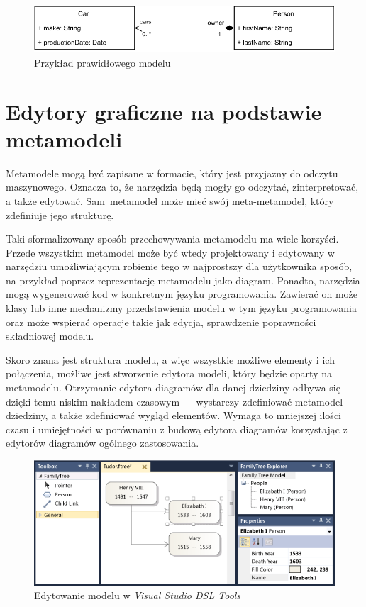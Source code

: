 \begin{figure}[!hb]
	\centering

	\includegraphics[width=0.95\linewidth]{./images/valid-uml-example.pdf}
	\caption{Przykład prawidłowego modelu
		}\label{rys:prawidlowy-model-uml}
\end{figure}

\section{Edytory graficzne na podstawie metamodeli}

Metamodele mogą być zapisane w formacie, który jest przyjazny do odczytu
maszynowego. Oznacza to, że narzędzia będą mogły go odczytać, zinterpretować, a
także edytować. Sam~metamodel może mieć swój meta-metamodel, który zdefiniuje
jego strukturę.

Taki sformalizowany sposób przechowywania metamodelu ma wiele
korzyści. Przede wszystkim metamodel może być wtedy projektowany i edytowany w
narzędziu umożliwiającym robienie tego w najprostszy dla użytkownika sposób, na
przykład poprzez reprezentację metamodelu jako diagram. Ponadto, narzędzia mogą
wygenerować kod w konkretnym języku programowania. Zawierać on może klasy lub
inne mechanizmy przedstawienia modelu w tym języku programowania oraz może
wspierać operacje takie jak edycja, sprawdzenie poprawności składniowej
modelu.

Skoro znana jest struktura modelu, a więc wszystkie możliwe elementy i ich
połączenia, możliwe jest stworzenie edytora modeli, który będzie oparty na
metamodelu. Otrzymanie edytora diagramów dla danej dziedziny odbywa się dzięki
temu niskim nakładem czasowym --- wystarczy zdefiniować metamodel dziedziny, a
także zdefiniować wygląd elementów. Wymaga to mniejszej ilości czasu i
umiejętności w porównaniu z budową edytora diagramów korzystając z
edytorów diagramów ogólnego zastosowania.

\begin{figure}[!b]
	\centering

	\includegraphics[width=0.95\linewidth]{./images/visual-studio-dsl-example.png}
	\caption{Edytowanie modelu w \emph{Visual Studio DSL
			Tools}}\label{rys:visual-studio-dsl-example}
\end{figure}


